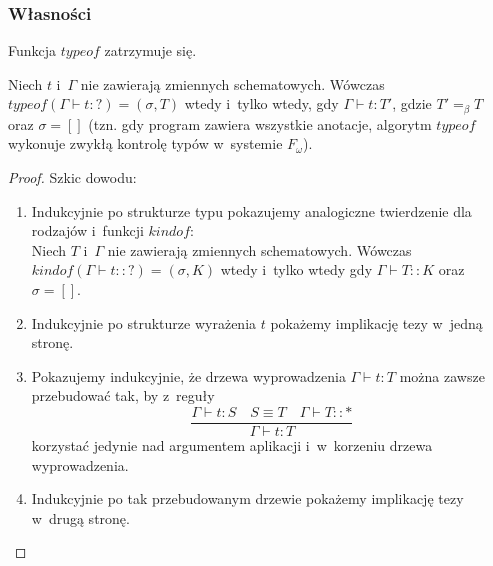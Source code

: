 \documentclass[11pt,leqno]{article}
\begin{document}
\subsubsection{Własności}

\begin{twierdzenie}
Funkcja $typeof$ zatrzymuje się.
\end{twierdzenie}

\begin{twierdzenie}
Niech $t$ i~$\Gamma$ nie zawierają zmiennych schematowych. Wówczas \mbox{$typeof(\Gamma \vdash t : ?) = (\sigma, T)$} wtedy 
i~tylko wtedy, gdy $\Gamma \vdash t : T'$, gdzie $T' =_\beta T$ oraz $\sigma = []$ (tzn. gdy program zawiera wszystkie anotacje, algorytm $typeof$ wykonuje zwykłą 
kontrolę typów w~systemie $F_\omega$).
\label{twtypecheck}
\end{twierdzenie}
\begin{proof}
Szkic dowodu:
\begin{enumerate}
\item Indukcyjnie po strukturze typu pokazujemy analogiczne twierdzenie dla rodzajów i~funkcji $kindof$:\\
Niech $T$ i~$\Gamma$ nie zawierają zmiennych schematowych. Wówczas \mbox{$kindof(\Gamma \vdash t :: ?) = (\sigma, K)$} wtedy
i~tylko wtedy gdy $\Gamma \vdash T :: K$ oraz $\sigma = []$.
\item Indukcyjnie po strukturze wyrażenia $t$ pokażemy implikację tezy w~jedną stronę.
\item Pokazujemy indukcyjnie, że drzewa wyprowadzenia $\Gamma \vdash t : T$ można zawsze przebudować tak, by
z~reguły
\[
\frac{\Gamma \vdash t : S \quad S \equiv T \quad \Gamma \vdash T :: *}{\Gamma \vdash t : T}
\]
korzystać jedynie nad argumentem aplikacji i~w~korzeniu drzewa wyprowadzenia.
\item Indukcyjnie po tak przebudowanym drzewie pokażemy implikację tezy w~drugą stronę.
\end{enumerate}
\end{proof}
\end{document}
